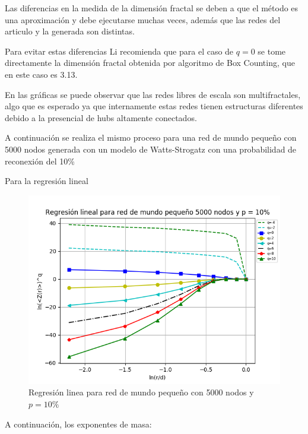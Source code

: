 Las diferencias en la medida de la dimensión fractal se deben a que el método es una aproximación y debe ejecutarse muchas veces, además que las redes del articulo y la generada son distintas.

Para evitar estas diferencias Li\cite{Li2014} recomienda que para el caso de $q=0$ se tome directamente la dimensión fractal obtenida por algoritmo de Box Counting, que en este caso es 3.13.

En las gráficas se puede observar que las redes libres de escala son multifractales, algo que es esperado ya que internamente estas redes tienen estructuras diferentes debido a la presencial de hubs altamente conectados.

A continuación se realiza el mismo proceso para una red de mundo pequeño con 5000 nodos generada con un modelo de Watts-Strogatz con una probabilidad de reconexión del 10\%

Para la regresión lineal

\begin{figure}[H]
    \centering
    \includegraphics[scale=0.7]{Capitulo4Multifractalidad/imagenes/smallWorld5000p10_TqLnrBCsmallWorld5000p10.png}
    \caption{Regresión linea para red de mundo pequeño con 5000 nodos y $p=10\%$}
\end{figure}

A continuación, los exponentes de masa:


